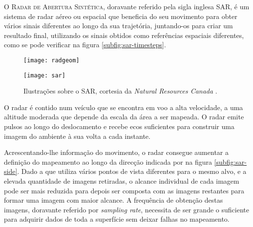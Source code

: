 \documentclass[purist,portuguese]{ist-report}
\begin{document}
O \textsc{Radar de Abertura Sintética}, doravante referido pela sigla inglesa SAR, é um sistema de radar aéreo ou espacial que beneficia do seu movimento para obter vários sinais diferentes ao longo da sua trajetória, juntando-os para criar um resultado final, utilizando os sinais obtidos como referências espaciais diferentes, como se pode verificar na figura \ref{subfig:sar-timesteps}.

\begin{figure}[ht]
	\centering
	\hspace*{\fill}
	\begin{minipage}[t]{0.43\textwidth}
		\centering
		\texttt{[image: radgeom]}
		\label{subfig:sar-side}
	\end{minipage}
	\hfill
	\begin{minipage}[t]{0.43\textwidth}
		\centering
		\texttt{[image: sar]}
		\label{subfig:sar-timesteps}
	\end{minipage}
	\hspace*{\fill}
	\caption{Ilustrações sobre o SAR, cortesia da \textit{Natural Resources Canada} \cite{nrcan}.}
	\label{fig:nrcan}
\end{figure}

O radar é contido num veículo que se encontra em voo a alta velocidade, a uma altitude moderada que depende da escala da área a ser mapeada. O radar emite pulsos ao longo do deslocamento e recebe ecos suficientes para construir uma imagem do ambiente à sua volta a cada instante.

Acrescentando-lhe informação do movimento, o radar consegue aumentar a definição do mapeamento ao longo da direcção indicada por  na figura \ref{subfig:sar-side}. Dado a que utiliza vários pontos de vista diferentes para o mesmo alvo, e a elevada quantidade de imagens retiradas, o alcance individual de cada imagem pode ser mais reduzida para depois ser composta com as imagens restantes para formar uma imagem com maior alcance. A frequência de obtenção destas imagens, doravante referido por \textit{sampling rate}, necessita de ser grande o suficiente para adquirir dados de toda a superfície sem deixar falhas no mapeamento.
\end{document}
